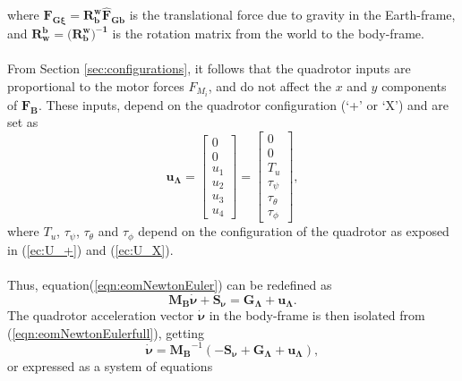 where $\mathbf{F_{G\xi}}=\mathbf{R_{b}^{w}}\mathbf{\hat{F}_{Gb}}$ is the translational force due to  gravity in the Earth-frame, and $\mathbf{R_{w}^{b}} = (\mathbf{R_{b}^{w})^{-1}}$ is the rotation matrix from the world to the body-frame.
\\\\
From Section \ref{sec:configurations}, it follows that the quadrotor inputs are proportional to the motor forces $F_{M_i}$, and do not affect the $x$ and $y$ components of $\mathbf{F_B}$. These inputs, depend on the quadrotor configuration (`+' or `X') and are set as
\begin{equation}
\mathbf{u_{\Lambda}} = \begin{bmatrix}
0 \\[5pt] 0 \\[5pt] u_1 \\[5pt] u_2 \\[5pt] u_3 \\[5pt] u_4
\end{bmatrix} = \begin{bmatrix}
0 \\[5pt] 0 \\[5pt] T_u\\[5pt]
	\tau_{\psi}\\[5pt]
	\tau_{\theta}\\[5pt]
	\tau_{\phi}
\end{bmatrix},
\end{equation}
where $T_u$, $\tau_\psi$, $\tau_\theta$ and $\tau_\phi$ depend on the configuration of the quadrotor as exposed in (\ref{ec:U_+}) and (\ref{ec:U_X}).
\\\\
Thus, equation(\ref{eqn:eomNewtonEuler}) can be redefined as
\begin{equation}
\label{eqn:eomNewtonEulerfull}
\mathbf{M_{B}}\mathbf{\dot{\nu}} + \mathbf{S_\nu} = \mathbf{G_{\Lambda}} + \mathbf{u_{\Lambda}}.
\end{equation}
The quadrotor acceleration vector $\mathbf{\dot{\nu}}$ in the body-frame is then isolated from (\ref{eqn:eomNewtonEulerfull}), getting
\begin{equation}
\mathbf{\dot{\nu}} = \mathbf{M_{B}}^{-1}(-\mathbf{S_\nu} + \mathbf{G_{\Lambda}} + \mathbf{u_{\Lambda}}),
\end{equation}
or expressed as a system of equations
